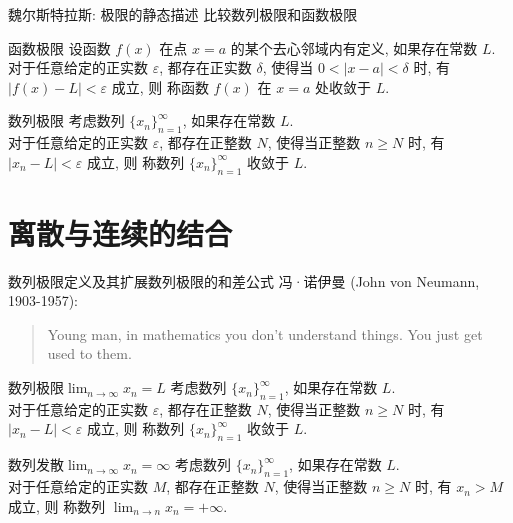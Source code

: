 \documentclass[
10pt,
aspectratio=43,
]{beamer}
\begin{document}
\begin{frame}{魏尔斯特拉斯: 极限的静态描述}
    比较数列极限和函数极限
    \begin{block}{函数极限}
        设函数 $f(x)$ 在点 {\color{red}$x=a$} 的某个去心邻域内有定义, 如果存在{\color{green}常数 $L$}.\\
        {\color{blue}对于任意给定的正实数 $\varepsilon$}, 都存在{\color{red}正实数 $\delta$, 使得当 $0 < |x-a| < \delta$ 时}, {\color{blue}有 $|f(x) - L| < \varepsilon$ 成立}, 则{\color{green} 称函数 $f(x)$ 在 $x=a$ 处收敛于 $L$}.
    \end{block}
    \begin{block}{数列极限}
        考虑数列 $\{x_n\}_{n=1}^\infty$, 如果存在{\color{green}常数 $L$}.\\
        {\color{blue}对于任意给定的正实数 $\varepsilon$}, 都存在{\color{red}正整数 $N$, 使得当正整数 $n\geq N$ 时}, {\color{blue}有 $|x_n - L| < \varepsilon$ 成立}, 则{\color{green} 称数列 $\{x_n\}_{n=1}^\infty$ 收敛于 $L$}.
    \end{block}
\end{frame}

\section{离散与连续的结合}

\begin{frame}{数列极限定义及其扩展}{数列极限的和差公式}
    冯·诺伊曼 (John von Neumann, 1903-1957):
    \begin{quote}
        Young man, in mathematics you don't understand things. You just get used to them.
    \end{quote}
    \pause
    \begin{block}{数列极限$\lim_{n\to\infty}x_n=L$}
        考虑数列 $\{x_n\}_{n=1}^\infty$, 如果存在{\color{green}常数 $L$}.\\
        {\color{blue}对于任意给定的正实数 $\varepsilon$}, 都存在{\color{red}正整数 $N$, 使得当正整数 $n\geq N$ 时}, {\color{blue}有 $|x_n - L| < \varepsilon$ 成立}, 则{\color{green} 称数列 $\{x_n\}_{n=1}^\infty$ 收敛于 $L$}.
    \end{block}
    \pause
    \begin{block}{数列发散$\lim_{n\to\infty}x_n=\infty$}
        考虑数列 $\{x_n\}_{n=1}^\infty$, 如果存在{\color{green}常数 $L$}.\\
        {\color{blue}对于任意给定的正实数 $M$}, 都存在{\color{red}正整数 $N$, 使得当正整数 $n\geq N$ 时}, {\color{blue}有 $x_n > M$ 成立}, 则{\color{green} 称数列 $\displaystyle\lim_{n\to n}x_n=+\infty$.}
    \end{block}
\end{frame}
\end{document}
